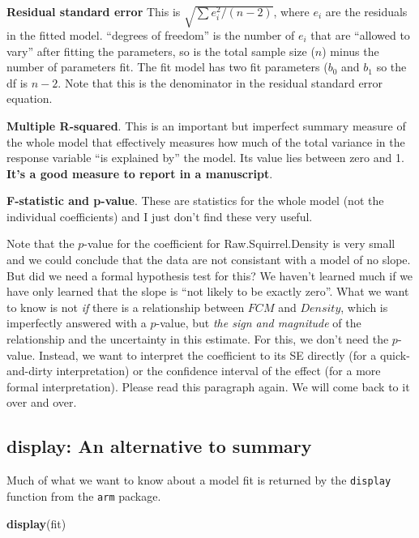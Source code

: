 \documentclass[]{book}
\newenvironment{Shaded}{\begin{snugshade}}{\end{snugshade}}
\newcommand{\KeywordTok}[1]{\textcolor[rgb]{0.13,0.29,0.53}{\textbf{#1}}}
\newcommand{\NormalTok}[1]{#1}
\theoremstyle{definition}
\theoremstyle{definition}
\theoremstyle{definition}
\theoremstyle{remark}
\begin{document}
\textbf{Residual standard error} This is \(\sqrt{\sum{e_i^2}/(n-2)}\),
where \(e_i\) are the residuals in the fitted model. ``degrees of
freedom'' is the number of \(e_i\) that are ``allowed to vary'' after
fitting the parameters, so is the total sample size (\(n\)) minus the
number of parameters fit. The fit model has two fit parameters (\(b_0\)
and \(b_1\) so the df is \(n-2\). Note that this is the denominator in
the residual standard error equation.

\textbf{Multiple R-squared}. This is an important but imperfect summary
measure of the whole model that effectively measures how much of the
total variance in the response variable ``is explained by'' the model.
Its value lies between zero and 1. \textbf{It's a good measure to report
in a manuscript}.

\textbf{F-statistic and p-value}. These are statistics for the whole
model (not the individual coefficients) and I just don't find these very
useful.

Note that the \(p\)-value for the coefficient for Raw.Squirrel.Density
is very small and we could conclude that the data are not consistant
with a model of no slope. But did we need a formal hypothesis test for
this? We haven't learned much if we have only learned that the slope is
``not likely to be exactly zero''. What we want to know is not \emph{if}
there is a relationship between \(FCM\) and \(Density\), which is
imperfectly answered with a \(p\)-value, but \emph{the sign and
magnitude} of the relationship and the uncertainty in this estimate. For
this, we don't need the \(p\)-value. Instead, we want to interpret the
coefficient to its SE directly (for a quick-and-dirty interpretation) or
the confidence interval of the effect (for a more formal
interpretation). Please read this paragraph again. We will come back to
it over and over.

\subsection{display: An alternative to
summary}\label{display-an-alternative-to-summary}

Much of what we want to know about a model fit is returned by the
\texttt{display} function from the \texttt{arm} package.

\begin{Shaded}
\begin{Highlighting}[]
\KeywordTok{display}\NormalTok{(fit)}
\end{Highlighting}
\end{Shaded}
\end{document}
